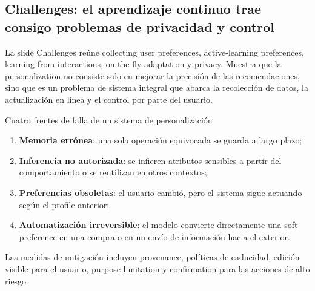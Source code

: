 
\subsection{Challenges: el aprendizaje continuo trae consigo problemas de privacidad y control}

La slide Challenges reúne collecting user preferences, active-learning preferences, learning from interactions, on-the-fly adaptation y privacy. Muestra que la personalization no consiste solo en mejorar la precisión de las recomendaciones, sino que es un problema de sistema integral que abarca la recolección de datos, la actualización en línea y el control por parte del usuario.


\begin{warningbox}{Cuatro frentes de falla de un sistema de personalización}
\begin{enumerate}
  \item \textbf{Memoria errónea}: una sola operación equivocada se guarda a largo plazo;
  \item \textbf{Inferencia no autorizada}: se infieren atributos sensibles a partir del comportamiento o se reutilizan en otros contextos;
  \item \textbf{Preferencias obsoletas}: el usuario cambió, pero el sistema sigue actuando según el profile anterior;
  \item \textbf{Automatización irreversible}: el modelo convierte directamente una soft preference en una compra o en un envío de información hacia el exterior.
\end{enumerate}
Las medidas de mitigación incluyen provenance, políticas de caducidad, edición visible para el usuario, purpose limitation y confirmation para las acciones de alto riesgo.
\end{warningbox}


